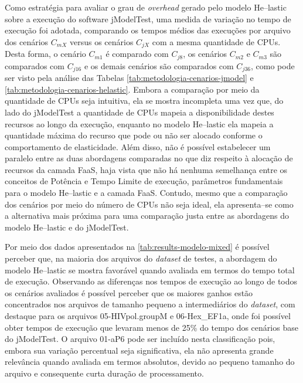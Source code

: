 \documentclass[english,brazilian]{UNISINOSmonografia} %
\begin{document}
Como estratégia para avaliar o grau de \textit{overhead} gerado pelo modelo \textsf{He}--lastic sobre a execução do software jModelTest, uma medida de variação no tempo de execução foi adotada, comparando os tempos médios das execuções por arquivo dos cenários $C_{mX}$ versus os cenários $C_{jX}$ com a mesma quantidade de CPUs.
%
Desta forma, o cenário $C_{m1}$ é comparado com $C_{j8}$, os cenários $C_{m2}$ e $C_{m3}$ são comparados com $C_{j16}$ e os demais cenários são comparados com $C_{j36}$, como pode ser visto pela análise das Tabelas \ref{tab:metodologia-cenarios-jmodel} e \ref{tab:metodologia-cenarios-helastic}.
%
Embora a comparação por meio da quantidade de CPUs seja intuitiva, ela se mostra incompleta uma vez que, do lado do jModelTest a quantidade de CPUs mapeia a disponibilidade destes recursos ao longo da execução, enquanto no modelo \textsf{He}--lastic ela mapeia a quantidade máxima do recurso que pode ou não ser alocado conforme o comportamento de elasticidade.
%
Além disso, não é possível estabelecer um paralelo entre as duas abordagens comparadas no que diz respeito à alocação de recursos da camada FaaS, haja vista que não há nenhuma semelhança entre os conceitos de Potência e Tempo Limite de execução, parâmetros fundamentais para o modelo \textsf{He}--lastic e a camada FaaS.
%
Contudo, mesmo que a comparação dos cenários por meio do número de CPUs não seja ideal, ela apresenta--se como a alternativa mais próxima para uma comparação justa entre as abordagens do modelo \textsf{He}--lastic e do jModelTest.



Por meio dos dados apresentados na \autoref{tab:results-modelo-mixed} é possível perceber que, na maioria dos arquivos do \textit{dataset} de testes, a abordagem do modelo \textsf{He}--lastic se mostra favorável quando avaliada em termos do tempo total de execução.
%
Observando as diferenças nos tempos de execução ao longo de todos os cenários avaliados é possível perceber que os maiores ganhos estão concentrados nos arquivos de tamanho pequeno a intermediários do \textit{dataset}, com destaque para os arquivos 05-HIVpol.groupM e 06-Hex\_EF1a, onde foi possível obter tempos de execução que levaram menos de 25\% do tempo dos cenários base do jModelTest.
%
O arquivo 01-aP6 pode ser incluído nesta classificação pois, embora sua variação percentual seja significativa, ela não apresenta grande relevância quando avaliada em termos absolutos, devido ao pequeno tamanho do arquivo e consequente curta duração de processamento.
\end{document}
